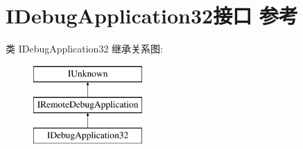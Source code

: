 \hypertarget{interface_i_debug_application32}{}\section{I\+Debug\+Application32接口 参考}
\label{interface_i_debug_application32}
类 I\+Debug\+Application32 继承关系图\+:\begin{figure}[H]
\begin{center}
\leavevmode
\includegraphics[height=3.000000cm]{interface_i_debug_application32}
\end{center}
\end{figure}
